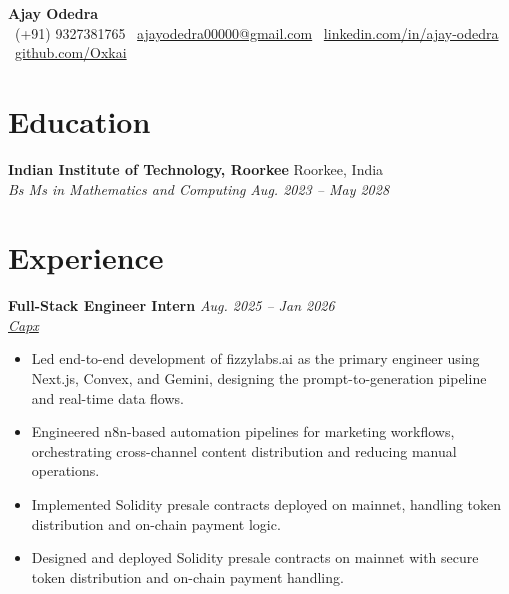 \documentclass[10pt,a4paper]{article}
\newcommand{\resumeEntry}[3]{
  \noindent\textbf{#1} \hfill \textit{#2} \\   
  \textit{#3} \vspace{-3pt}
}
\begin{document}
\begin{center}
    {\Large \textbf{Ajay Odedra}} \\[4pt]
    \small 
    \faPhone\ (+91) 9327381765 \quad
    \faEnvelope\ \href{mailto:ajayodedra00000@gmail.com}{ajayodedra00000@gmail.com} \quad
    \faLinkedin\ \href{https://www.linkedin.com/in/ajay-odedra-b26923283/}{linkedin.com/in/ajay-odedra} \quad
    \faGithub\ \href{https://github.com/Oxkai}{github.com/Oxkai}
\end{center}

\vspace{-5pt}

\section{Education}

\noindent\textbf{Indian Institute of Technology, Roorkee} \hfill Roorkee, India \\
\textit{Bs Ms in Mathematics and Computing} \hfill \textit{Aug. 2023 -- May 2028}

\section{Experience}



\resumeEntry{Full-Stack Engineer Intern}{Aug. 2025 -- Jan 2026}{\href{https://www.capx.ai/}{Capx}}

\begin{itemize}
    \item Led end-to-end development of fizzylabs.ai as the primary engineer using Next.js, Convex, and Gemini, designing the prompt-to-generation pipeline and real-time data flows.
    \item Engineered n8n-based automation pipelines for marketing workflows, orchestrating cross-channel content distribution and reducing manual operations.
    \item Implemented Solidity presale contracts deployed on mainnet, handling token distribution and on-chain payment logic.
    \item Designed and deployed Solidity presale contracts on mainnet with secure token distribution and on-chain payment handling.
\end{itemize}
\end{document}
